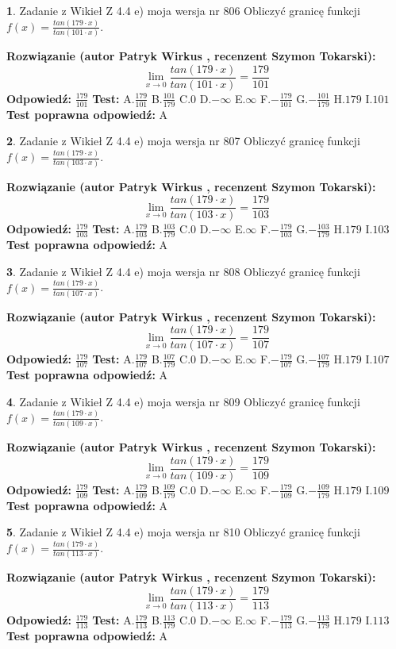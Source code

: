 \documentclass[12pt, a4paper]{article}
\theoremstyle{definition} %
\newtheorem{zad}{}
\newcommand{\zadStart}[1]{\begin{zad}#1\newline}
\newcommand{\zadStop}{\end{zad}}
\newcommand{\rozwStart}[2]{\noindent \textbf{Rozwiązanie (autor #1 , recenzent #2): }\newline}
\newcommand{\rozwStop}{\newline}
\newcommand{\odpStart}{\noindent \textbf{Odpowiedź:}\newline}
\newcommand{\odpStop}{\newline}
\newcommand{\testStart}{\noindent \textbf{Test:}\newline}
\newcommand{\testStop}{\newline}
\newcommand{\kluczStart}{\noindent \textbf{Test poprawna odpowiedź:}\newline}
\newcommand{\kluczStop}{\newline}
\begin{document}
\zadStart{Zadanie z Wikieł Z 4.4 e) moja wersja nr 806}
Obliczyć granicę funkcji $f(x)=\frac{tan(179\cdot x)}{tan(101\cdot x)}$.
\zadStop
\rozwStart{Patryk Wirkus}{Szymon Tokarski}
$$\lim\limits_{x\to 0}\frac{tan(179\cdot x)}{tan(101\cdot x)}=
\frac{179}{101}$$
\rozwStop
\odpStart
$\frac{179}{101}$
\odpStop
\testStart
A.$\frac{179}{101}$
B.$\frac{101}{179}$
C.$0$
D.$-\infty$
E.$\infty$
F.$-\frac{179}{101}$
G.$-\frac{101}{179}$
H.$179$
I.$101$
\testStop
\kluczStart
A
\kluczStop



\zadStart{Zadanie z Wikieł Z 4.4 e) moja wersja nr 807}
Obliczyć granicę funkcji $f(x)=\frac{tan(179\cdot x)}{tan(103\cdot x)}$.
\zadStop
\rozwStart{Patryk Wirkus}{Szymon Tokarski}
$$\lim\limits_{x\to 0}\frac{tan(179\cdot x)}{tan(103\cdot x)}=
\frac{179}{103}$$
\rozwStop
\odpStart
$\frac{179}{103}$
\odpStop
\testStart
A.$\frac{179}{103}$
B.$\frac{103}{179}$
C.$0$
D.$-\infty$
E.$\infty$
F.$-\frac{179}{103}$
G.$-\frac{103}{179}$
H.$179$
I.$103$
\testStop
\kluczStart
A
\kluczStop



\zadStart{Zadanie z Wikieł Z 4.4 e) moja wersja nr 808}
Obliczyć granicę funkcji $f(x)=\frac{tan(179\cdot x)}{tan(107\cdot x)}$.
\zadStop
\rozwStart{Patryk Wirkus}{Szymon Tokarski}
$$\lim\limits_{x\to 0}\frac{tan(179\cdot x)}{tan(107\cdot x)}=
\frac{179}{107}$$
\rozwStop
\odpStart
$\frac{179}{107}$
\odpStop
\testStart
A.$\frac{179}{107}$
B.$\frac{107}{179}$
C.$0$
D.$-\infty$
E.$\infty$
F.$-\frac{179}{107}$
G.$-\frac{107}{179}$
H.$179$
I.$107$
\testStop
\kluczStart
A
\kluczStop



\zadStart{Zadanie z Wikieł Z 4.4 e) moja wersja nr 809}
Obliczyć granicę funkcji $f(x)=\frac{tan(179\cdot x)}{tan(109\cdot x)}$.
\zadStop
\rozwStart{Patryk Wirkus}{Szymon Tokarski}
$$\lim\limits_{x\to 0}\frac{tan(179\cdot x)}{tan(109\cdot x)}=
\frac{179}{109}$$
\rozwStop
\odpStart
$\frac{179}{109}$
\odpStop
\testStart
A.$\frac{179}{109}$
B.$\frac{109}{179}$
C.$0$
D.$-\infty$
E.$\infty$
F.$-\frac{179}{109}$
G.$-\frac{109}{179}$
H.$179$
I.$109$
\testStop
\kluczStart
A
\kluczStop



\zadStart{Zadanie z Wikieł Z 4.4 e) moja wersja nr 810}
Obliczyć granicę funkcji $f(x)=\frac{tan(179\cdot x)}{tan(113\cdot x)}$.
\zadStop
\rozwStart{Patryk Wirkus}{Szymon Tokarski}
$$\lim\limits_{x\to 0}\frac{tan(179\cdot x)}{tan(113\cdot x)}=
\frac{179}{113}$$
\rozwStop
\odpStart
$\frac{179}{113}$
\odpStop
\testStart
A.$\frac{179}{113}$
B.$\frac{113}{179}$
C.$0$
D.$-\infty$
E.$\infty$
F.$-\frac{179}{113}$
G.$-\frac{113}{179}$
H.$179$
I.$113$
\testStop
\kluczStart
A
\kluczStop
\end{document}
